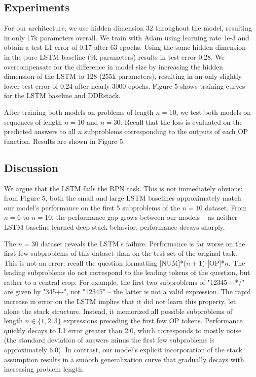 \documentclass{article}
\begin{document}
\subsection{Experiments}
For our architecture, we use hidden dimension 32 throughout the model, resulting in only 17k parameters overall. We train with Adam using learning rate 1e-3 and obtain a test L1 error of 0.17 after 63 epochs. Using the same hidden dimension in the pure LSTM baseline (9k parameters) results in test error 0.28. We overcompensate for the difference in model size by increasing the hidden dimension of the LSTM to 128 (255k parameters), resulting in an only slightly lower test error of 0.24 after nearly 3000 epochs. Figure 5 shows training curves for the LSTM baseline and DDRstack.

After training both models on problems of length $n=10$, we test both models on sequences of length $n=10$ and $n=30$. Recall that the loss is evaluated on the predicted answers to all $n$ subproblems corresponding to the outputs of each OP function. Results are shown in Figure 5.

\subsection{Discussion}
We argue that the LSTM fails the RPN task. This is not immediately obvious: from Figure 5, both the small and large LSTM baselines approximately match our model's performance on the first 5 subproblems of the $n=10$ dataset. From $n=6$ to $n=10$, the performance gap grows between our models -- as neither LSTM baseline learned deep stack behavior, performance decays sharply. 

The $n=30$ dataset reveals the LSTM's failure. Performance is far worse on the first few subproblems of this dataset than on the test set of the original task. This is not an error: recall the question formatting [NUM]*($n+1$)-[OP]*$n$. The leading subproblems do not correspond to the leading tokens of the question, but rather to a central crop. For example, the first two subproblems of "12345+-*/" are given by "345+-", not "12345" -- the latter is not a valid expression. The rapid increase in error on the LSTM implies that it did not learn this property, let alone the stack structure. Instead, it memorized all possible subproblems of length $n\in \{1, 2, 3\}$ expressions preceding the first few OP tokens. Performance quickly decays to L1 error greater than 2.0, which corresponds to mostly noise (the standard deviation of answers minus the first few subproblems is approximately 6.0). In contrast, our model's explicit incorporation of the stack assumption results in a smooth generalization curve that gradually decays with increasing problem length.
\end{document}
